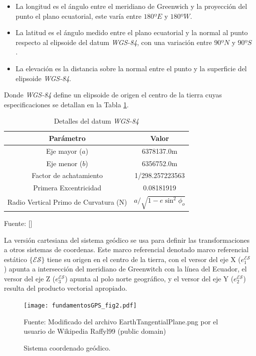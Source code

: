 \documentclass[10pt]{report}
\numberwithin{equation}{chapter}
\numberwithin{algorithm}{chapter}
\newcommand{\bcite}[1]{[\cite{#1}]}
\newcommand{\marco}[1]{\{\mathcal{#1}\}}
\begin{document}
\begin{itemize}
\item La longitud es el ángulo entre el meridiano de Greenwich y la proyección del punto el plano ecuatorial, este varía entre $180ºE$ y $180ºW$.
\item La latitud es el ángulo medido entre el plano ecuatorial y la normal al punto respecto al elipsoide del datum \emph{WGS-84}, con una variación entre $90ºN$ y $90ºS$.
\item La elevación es la distancia sobre la normal entre el punto y la superficie del elipsoide \emph{WGS-84}. 
\end{itemize}
Donde \emph{WGS-84} define un elipsoide de origen el centro de la tierra cuyas especificaciones se detallan en la Tabla \ref{fundamentosGPS_tb1}. 
\begin{table}
\begin{center}
\begin{tabular}{|c|c|} \hline
\textbf{Parámetro}&\textbf{Valor}\\ \hline
Eje mayor ($a$)& 6378137.0m \\ \hline
Eje menor ($b$)& 6356752.0m \\ \hline
Factor de achatamiento& 1/298.257223563 \\ \hline
Primera Excentricidad& 0.08181919 \\ \hline
Radio Vertical Primo de Curvatura (N)& $a/\sqrt{1-e\sin^2{\phi_o}}$ \\ \hline
\end{tabular}
\caption{Detalles del datum \emph{WGS-84}}
\scriptsize{Fuente: \bcite{Cai2011}}
\label{fundamentosGPS_tb1}
\end{center}
\end{table}
La versión cartesiana del sistema geódico se usa para definir las transformaciones a otros sistemas de coordenas. Este marco referencial denotado marco referencial estático $\marco{ES}$ tiene su origen en el centro de la tierra, con el versor del eje X ($e_1^{\mathcal{ES}}$) apunta a intersección del meridiano de Greenwitch con la línea del Ecuador, el versor del eje Z ($e_3^{\mathcal{ES}}$) apunta al polo norte geográfico, y el versor del eje Y ($e_2^{\mathcal{ES}}$) resulta del producto vectorial apropiado.
\begin{figure}
\begin{center}
\texttt{[image: fundamentosGPS\_fig2.pdf]}
\caption{Sistema coordenado geódico.}
\scriptsize{Fuente: Modificado del archivo EarthTangentialPlane.png por el usuario de Wikipedia Raffyl99 (public domain)}
\label{fundamentosGPS_fig2}
\end{center}
\end{figure}
\end{document}
